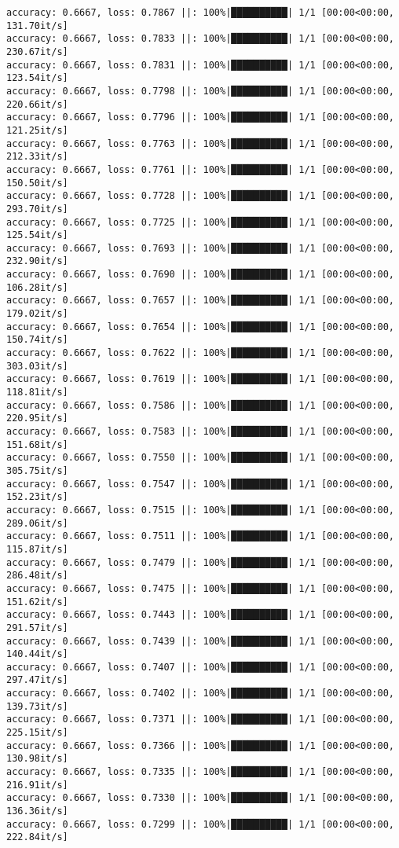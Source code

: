 \documentclass[
]{article}
\begin{document}
\begin{verbatim}
accuracy: 0.6667, loss: 0.7867 ||: 100%|██████████| 1/1 [00:00<00:00, 131.70it/s]
accuracy: 0.6667, loss: 0.7833 ||: 100%|██████████| 1/1 [00:00<00:00, 230.67it/s]
accuracy: 0.6667, loss: 0.7831 ||: 100%|██████████| 1/1 [00:00<00:00, 123.54it/s]
accuracy: 0.6667, loss: 0.7798 ||: 100%|██████████| 1/1 [00:00<00:00, 220.66it/s]
accuracy: 0.6667, loss: 0.7796 ||: 100%|██████████| 1/1 [00:00<00:00, 121.25it/s]
accuracy: 0.6667, loss: 0.7763 ||: 100%|██████████| 1/1 [00:00<00:00, 212.33it/s]
accuracy: 0.6667, loss: 0.7761 ||: 100%|██████████| 1/1 [00:00<00:00, 150.50it/s]
accuracy: 0.6667, loss: 0.7728 ||: 100%|██████████| 1/1 [00:00<00:00, 293.70it/s]
accuracy: 0.6667, loss: 0.7725 ||: 100%|██████████| 1/1 [00:00<00:00, 125.54it/s]
accuracy: 0.6667, loss: 0.7693 ||: 100%|██████████| 1/1 [00:00<00:00, 232.90it/s]
accuracy: 0.6667, loss: 0.7690 ||: 100%|██████████| 1/1 [00:00<00:00, 106.28it/s]
accuracy: 0.6667, loss: 0.7657 ||: 100%|██████████| 1/1 [00:00<00:00, 179.02it/s]
accuracy: 0.6667, loss: 0.7654 ||: 100%|██████████| 1/1 [00:00<00:00, 150.74it/s]
accuracy: 0.6667, loss: 0.7622 ||: 100%|██████████| 1/1 [00:00<00:00, 303.03it/s]
accuracy: 0.6667, loss: 0.7619 ||: 100%|██████████| 1/1 [00:00<00:00, 118.81it/s]
accuracy: 0.6667, loss: 0.7586 ||: 100%|██████████| 1/1 [00:00<00:00, 220.95it/s]
accuracy: 0.6667, loss: 0.7583 ||: 100%|██████████| 1/1 [00:00<00:00, 151.68it/s]
accuracy: 0.6667, loss: 0.7550 ||: 100%|██████████| 1/1 [00:00<00:00, 305.75it/s]
accuracy: 0.6667, loss: 0.7547 ||: 100%|██████████| 1/1 [00:00<00:00, 152.23it/s]
accuracy: 0.6667, loss: 0.7515 ||: 100%|██████████| 1/1 [00:00<00:00, 289.06it/s]
accuracy: 0.6667, loss: 0.7511 ||: 100%|██████████| 1/1 [00:00<00:00, 115.87it/s]
accuracy: 0.6667, loss: 0.7479 ||: 100%|██████████| 1/1 [00:00<00:00, 286.48it/s]
accuracy: 0.6667, loss: 0.7475 ||: 100%|██████████| 1/1 [00:00<00:00, 151.62it/s]
accuracy: 0.6667, loss: 0.7443 ||: 100%|██████████| 1/1 [00:00<00:00, 291.57it/s]
accuracy: 0.6667, loss: 0.7439 ||: 100%|██████████| 1/1 [00:00<00:00, 140.44it/s]
accuracy: 0.6667, loss: 0.7407 ||: 100%|██████████| 1/1 [00:00<00:00, 297.47it/s]
accuracy: 0.6667, loss: 0.7402 ||: 100%|██████████| 1/1 [00:00<00:00, 139.73it/s]
accuracy: 0.6667, loss: 0.7371 ||: 100%|██████████| 1/1 [00:00<00:00, 225.15it/s]
accuracy: 0.6667, loss: 0.7366 ||: 100%|██████████| 1/1 [00:00<00:00, 130.98it/s]
accuracy: 0.6667, loss: 0.7335 ||: 100%|██████████| 1/1 [00:00<00:00, 216.91it/s]
accuracy: 0.6667, loss: 0.7330 ||: 100%|██████████| 1/1 [00:00<00:00, 136.36it/s]
accuracy: 0.6667, loss: 0.7299 ||: 100%|██████████| 1/1 [00:00<00:00, 222.84it/s]

\end{verbatim}
\end{document}
